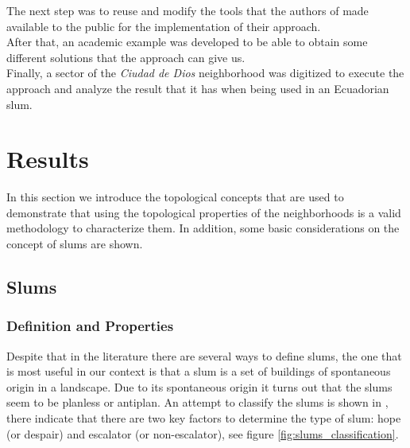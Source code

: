 \documentclass[10pt]{article}
\begin{document}
The next step was to reuse and modify the tools that the authors of \cite{bre} made available to the public for the implementation of their approach.\\

After that, an academic example was developed to be able to obtain some different solutions that the approach can give us.\\

Finally, a sector of the \emph{Ciudad de Dios} neighborhood was digitized to execute the approach and analyze the result that it has when being used in an Ecuadorian slum.\\


\section{Results}

In this section we introduce the topological concepts that are used to demonstrate that using the topological properties of the neighborhoods is a valid methodology to characterize them. In addition, some basic considerations on the concept of slums are shown.

\subsection{Slums}
\subsubsection{Definition and Properties}
Despite that in the literature there are several ways to define slums, the one that is most useful in our context is that a slum is a set of buildings of spontaneous origin in a landscape. Due to its spontaneous origin it turns out that the slums seem to be planless or antiplan\cite{stokes1962theory}. An attempt to classify the slums is shown in \cite{stokes1962theory}, there indicate that there are two key factors to determine the type of slum: hope (or despair) and escalator (or non-escalator), see figure \ref{fig:slums_classification}.\\
\end{document}
